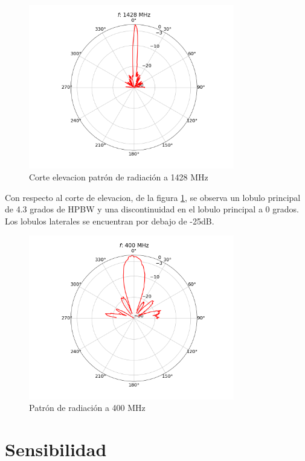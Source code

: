\begin{figure}
    \centering
    \includegraphics[width=0.8\textwidth]{img/1420rpel}
    \caption{Corte elevacion patrón de radiación a 1428 MHz}
    \label{fig:1420rpel}
\end{figure}

Con respecto al corte de elevacion, de la figura \ref{fig:1420rpel}, se observa un lobulo principal de 4.3 grados de HPBW y una discontinuidad en el lobulo principal a 0 grados. Los lobulos laterales  se encuentran por debajo de -25dB.\\

\begin{figure}
    \centering
    \includegraphics[width=0.8\textwidth]{img/400rp}
    \caption{Patrón de radiación a 400 MHz}
    \label{fig:400rp}
\end{figure}


\section{Sensibilidad}

